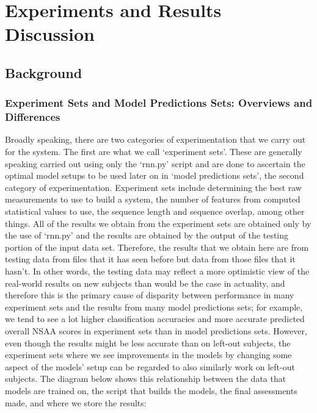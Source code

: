 \documentclass[12pt,twoside]{report}
\begin{document}
\part{Experiments and Results Discussion} 



\chapter{Background\\}




\section{Experiment Sets and Model Predictions Sets: Overviews and Differences}

\quad Broadly speaking, there are two categories of experimentation that we carry out for the system. The first are what we call ‘experiment sets’. These are generally speaking carried out using only the ‘rnn.py’ script and are done to ascertain the optimal model setups to be used later on in ‘model predictions sets’, the second category of experimentation. Experiment sets include determining the best raw measurements to use to build a system, the number of features from computed statistical values to use, the sequence length and sequence overlap, among other things. All of the results we obtain from the experiment sets are obtained only by the use of ‘rnn.py’ and the results are obtained by the output of the testing portion of the input data set. Therefore, the results that we obtain here are from testing data from files that it has seen before but data from those files that it hasn’t. In other words, the testing data may reflect a more optimistic view of the real-world results on new subjects than would be the case in actuality, and therefore this is the primary cause of disparity between performance in many experiment sets and the results from many model predictions sets; for example, we tend to see a lot higher classification accuracies and more accurate predicted overall NSAA scores in experiment sets than in model predictions sets. However, even though the results might be less accurate than on left-out subjects, the experiment sets where we see improvements in the models by changing some aspect of the models’ setup can be regarded to also similarly work on left-out subjects. The diagram below shows this relationship between the data that models are trained on, the script that builds the models, the final assessments made, and where we store the results:
\end{document}

